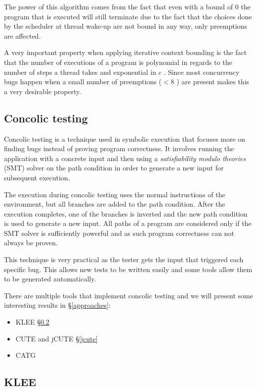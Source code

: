 \documentclass[10pt]{llncs}
\begin{document}
The power of this algorithm comes from the fact that even with a bound of 0 the program that is executed will still terminate due to the fact that the choices done by the scheduler at thread wake-up are not bound in any way, only preemptions are affected.

A very important property when applying iterative context bounding is the fact that the number of executions of a program is polynomial in regards to the number of steps a thread takes and exponential in $c$ \cite{iterativecontextbound}. Since most concurrency bugs happen when a small number of preemptions ($ < 8$ \cite[§4.1]{iterativecontextbound}) are present makes this a very desirable property.

\subsection{Concolic testing}

Concolic testing is a technique used in symbolic execution that focuses more on finding bugs instead of proving program correctness. It involves running the application with a concrete input and then using a \emph{satisfiability modulo theories} (SMT) solver on the path condition in order to generate a new input for subsequent execution.

The execution during concolic testing uses the normal instructions of the environment, but all branches are added to the path condition. After the execution completes, one of the branches is inverted and the new path condition is used to generate a new input. All paths of a program are considered only if the SMT solver is sufficiently powerful and as such program correctness can not always be proven.

This technique is very practical as the tester gets the input that triggered each specific bug. This allows new tests to be written easily and some tools allow them to be generated automatically.

There are multiple tools that implement concolic testing and we will present some interesting results in §\ref{approaches}:

\begin{itemize}
	\item KLEE \cite{klee} §\ref{klee}
	\item CUTE and jCUTE \cite{base4} §\ref{jcute}
	\item CATG  \cite{catg}
\end{itemize}

\subsection{KLEE}
\label{klee}
\end{document}
